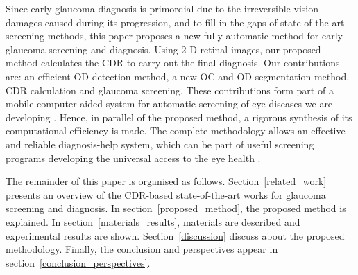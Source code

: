 Since early glaucoma diagnosis is primordial due to the irreversible vision damages caused during its progression, and to fill in the gaps of state-of-the-art screening methods, this paper proposes a new fully-automatic method for early glaucoma screening and diagnosis. Using 2-D retinal images, our proposed method calculates the CDR to carry out the final diagnosis. Our contributions are: an efficient OD detection method, a new OC and OD segmentation method, CDR calculation and glaucoma screening. These contributions form part of a mobile computer-aided system for automatic screening of eye diseases we are developing \citep{elloumi}.
Hence, in parallel of the proposed method, a rigorous synthesis of its computational efficiency is made. The complete methodology allows an effective and reliable diagnosis-help system, which can be part of useful screening programs developing the universal access to the eye health \citep{blanckenberg,bourouis}. 

The remainder of this paper is organised as follows. \mbox{Section \ref{related_work}} presents an overview of the CDR-based state-of-the-art works for glaucoma screening and diagnosis. In \mbox{section \ref{proposed_method}}, the proposed method is explained. In \mbox{section \ref{materials_results}}, materials are described and experimental results are shown. \mbox{Section \ref{discussion}} discuss about the proposed methodology. Finally, the conclusion and perspectives appear in \mbox{section \ref{conclusion_perspectives}}.

